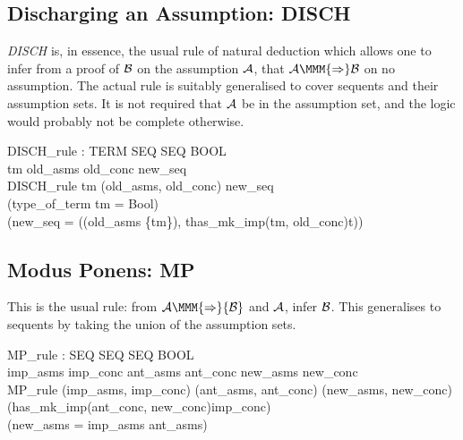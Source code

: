\documentclass[a4paper,11pt,titlepage]{article}
\begin{document}
\begin{titlepage}
\subsection{Discharging an Assumption: DISCH}

{\it DISCH} is, in essence,
the usual rule of natural deduction
which allows one to infer from a proof of $\cal B$
on the assumption $\cal A$, that
${\cal A} \MMM{\Rightarrow} \cal B$ on no assumption.
The actual rule is suitably generalised to cover
sequents and their assumption sets. It is not
required that $\cal A$ be in the assumption set,
and the logic would probably not be complete
otherwise.

\begin{HOLConst}
\+	\PrNL{}DISCH\_rule\PrNN{} : TERM \MMM{\rightarrow} SEQ \MMM{\rightarrow} SEQ \MMM{\rightarrow} BOOL\\
\PrPH{}
\+	\MMM{\forall} tm old\_asms old\_conc new\_seq \MMM{\bullet}\\
\+	DISCH\_rule tm (old\_asms, old\_conc) new\_seq \MMM{\Leftrightarrow}\\
\+	(type\_of\_term tm = Bool) \MMM{\land}\\
\+	(new\_seq = ((old\_asms \Backslash{} \{tm\}), \MMM{\epsilon}t\MMM{\bullet}has\_mk\_imp(tm, old\_conc)t))\\
\end{HOLConst}

\subsection{Modus Ponens: MP}

This is the usual rule: from ${\cal A} \MMM{\Rightarrow} {\cal B}$
and ${\cal A}$, infer ${\cal B}$.
This generalises to sequents by taking the union
of the assumption sets.

\begin{HOLConst}
\+	\PrNL{}MP\_rule\PrNN{} : SEQ \MMM{\rightarrow} SEQ \MMM{\rightarrow} SEQ \MMM{\rightarrow} BOOL\\
\PrPH{}
\+	\MMM{\forall} imp\_asms imp\_conc ant\_asms ant\_conc new\_asms new\_conc \MMM{\bullet}\\
\+	MP\_rule (imp\_asms, imp\_conc) (ant\_asms, ant\_conc) (new\_asms, new\_conc) \MMM{\Leftrightarrow}\\
\+	(has\_mk\_imp(ant\_conc, new\_conc)imp\_conc) \MMM{\land}\\
\+	(new\_asms = imp\_asms \MMM{\cup} ant\_asms)\\
\end{HOLConst}



\end{titlepage}
\end{document}
